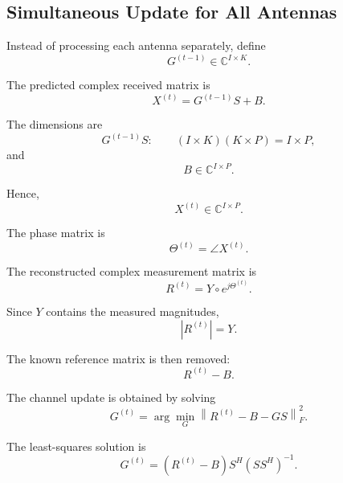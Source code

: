 \documentclass[12pt,a4paper]{article}
\begin{document}
\subsection{Simultaneous Update for All Antennas}

Instead of processing each antenna separately, define
\begin{equation}
\boxed{
G^{(t-1)}
\in
\mathbb{C}^{I\times K}
}.
\tag{307}
\end{equation}

The predicted complex received matrix is
\begin{equation}
\boxed{
X^{(t)}
=
G^{(t-1)}S+B
}.
\tag{308}
\end{equation}

The dimensions are
\begin{equation}
G^{(t-1)}S:
\qquad
(I\times K)(K\times P)
=
I\times P,
\tag{309}
\end{equation}
and
\begin{equation}
B\in\mathbb{C}^{I\times P}.
\tag{310}
\end{equation}

Hence,
\begin{equation}
\boxed{
X^{(t)}
\in
\mathbb{C}^{I\times P}
}.
\tag{311}
\end{equation}

The phase matrix is
\begin{equation}
\boxed{
\Theta^{(t)}
=
\angle X^{(t)}
}.
\tag{312}
\end{equation}

The reconstructed complex measurement matrix is
\begin{equation}
\boxed{
R^{(t)}
=
Y\circ e^{j\Theta^{(t)}}
}.
\tag{313}
\end{equation}

Since $Y$ contains the measured magnitudes,
\begin{equation}
|R^{(t)}|
=
Y.
\tag{314}
\end{equation}

The known reference matrix is then removed:
\begin{equation}
\boxed{
R^{(t)}-B
}.
\tag{315}
\end{equation}

The channel update is obtained by solving
\begin{equation}
\boxed{
G^{(t)}
=
\arg\min_{G}
\left\|
R^{(t)}-B-GS
\right\|_F^2
}.
\tag{316}
\end{equation}

The least-squares solution is
\begin{equation}
\boxed{
G^{(t)}
=
(R^{(t)}-B)S^H(SS^H)^{-1}
}.
\tag{317}
\end{equation}
\end{document}
